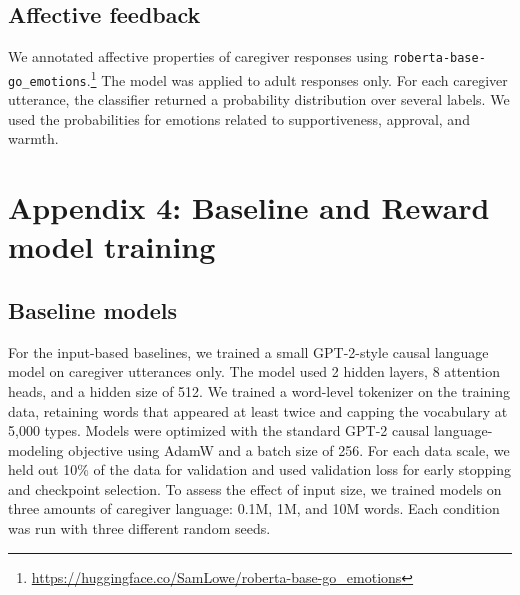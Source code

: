 \subsection*{Affective feedback}

We annotated affective properties of caregiver responses using \texttt{roberta-base-go\_emotions}.\footnote{\url{https://huggingface.co/SamLowe/roberta-base-go_emotions}} The model was applied to adult responses only. For each caregiver utterance, the classifier returned a probability distribution over several labels. We used the probabilities for emotions related to supportiveness, approval, and warmth.






\section*{Appendix 4: Baseline and Reward model training}

\subsection*{Baseline models}
For the input-based baselines, we trained a small GPT-2-style causal language model on caregiver utterances only. The model used 2 hidden layers, 8 attention heads, and a hidden size of 512. We trained a word-level tokenizer on the training data, retaining words that appeared at least twice and capping the vocabulary at 5,000 types. Models were optimized with the standard GPT-2 causal language-modeling objective using AdamW and a batch size of 256. For each data scale, we held out 10\% of the data for validation and used validation loss for early stopping and checkpoint selection. To assess the effect of input size, we trained models on three amounts of caregiver language: 0.1M, 1M, and 10M words. Each condition was run with three different random seeds.

